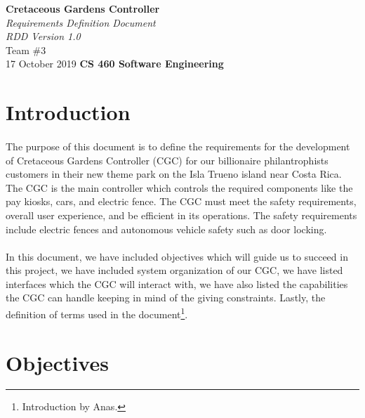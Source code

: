 \documentclass[12pt]{article}
\begin{document}
\begin{titlepage}
\begin{flushleft}
\vspace*{1cm}
\Huge
\textbf{Cretaceous Gardens Controller}\\
\vspace{1cm}
\Huge
\textit{Requirements Definition Document}\\
\vspace{1cm}
\Large
\textit{RDD Version 1.0}\\
\vspace{5cm}
\LARGE
Team \#3\\
17 October 2019
\vfill
\Huge
\textbf{CS 460 Software Engineering}
\end{flushleft}
\end{titlepage}
\normalsize
\tableofcontents
\newpage
\section{Introduction}
\paragraph{} The purpose of this document is to define the requirements for the development of Cretaceous Gardens Controller (CGC) for our billionaire philantrophists customers in their new theme park on the Isla Trueno island near Costa Rica. The CGC is the main controller which controls the required components like the pay kiosks, cars, and electric fence. The CGC must meet the safety requirements, overall user experience, and be efficient in its operations. The safety requirements include electric fences and autonomous vehicle safety such as door locking.
\paragraph{}  In this document, we have included objectives which will guide us to succeed in this project, we have included system organization of our CGC,  we have listed interfaces which the CGC will interact with, we have also listed the capabilities the CGC can handle keeping in mind of the giving constraints. Lastly, the definition of terms used in the document\footnote{Introduction by Anas.}.  

\section{Objectives} 
\label{obj}
\end{document}
